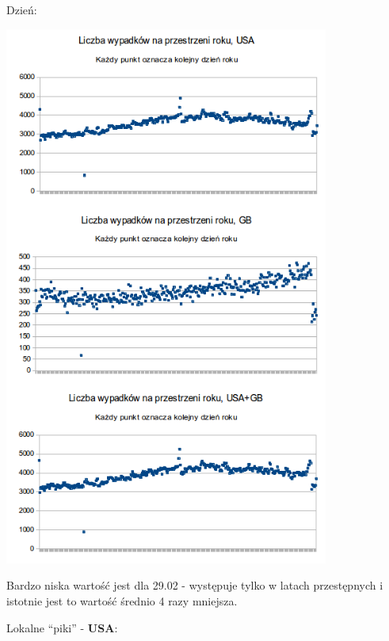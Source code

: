 Dzień:\\\centerline{\includegraphics[width=0.8\textwidth]{images/statistics/day_of_year.png}}

Bardzo niska wartość jest dla 29.02 - występuje tylko w latach
przestępnych i istotnie jest to wartość średnio 4 razy mniejsza.

Lokalne ``piki'' - \textbf{USA}:

